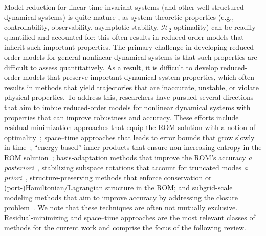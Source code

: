 \documentclass[3p,computermodern,10pt]{elsarticle}
\begin{document}
Model reduction for linear-time-invariant systems (and other well structured
dynamical systems) is quite mature
\cite{wilcox_benner_rev,moore,roberts,GugercinIRKA}, as system-theoretic properties (e.g., controllability,
observability, asymptotic stability, $\mathcal H_2$-optimality) can be readily
quantified and accounted for; this often results in
reduced-order models that inherit such important properties.  The primary
challenge in
developing reduced-order models for general nonlinear dynamical systems is
that such properties are difficult to assess quantitatively. As a result, it
is difficult to develop reduced-order models that preserve important
dynamical-system properties, which often results in methods that yield
trajectories that are
inaccurate, unstable, or violate physical properties.  To address this, researchers have pursued several directions that
aim to imbue reduced-order models for nonlinear
dynamical systems with properties that can improve robustness and accuracy.
These
efforts include residual-minimization approaches that equip the ROM solution with a notion of optimality~\cite{carlberg_lspg,carlberg_gnat,legresley_1,legresley_2,legresley_3,bui_resmin_steady,bui_unsteady,rovas_thesis,carlberg_thesis,bui_thesis,l1};
space--time approaches that leads to error bounds that grow slowly in time~\cite{choi_stlspg,constantine_strom,URBAN2012203,Yano2014ASC,benner_st};
``energy-based'' inner
products that ensure non-increasing entropy in the ROM
solution~\cite{rowley_pod_energyproj,Kalashnikova_sand2014,chan2019entropy};
basis-adaptation methods that improve the ROM's accuracy \textit{a
posteriori}~\cite{carlberg_hadaptation,adeim_peherstorfer,etter2019online}, stabilizing subspace rotations that account for truncated modes \textit{a priori}~\cite{basis_rotation}, structure-preserving
methods that enforce conservation \cite{carlberg_conservative_rom} or
(port-)Hamiltonian/Lagrangian structure
\cite{LALL2003304,carlberg2012spd,structurePreserveBeattie,chaturantabut2016structure,farhat2014dimensional} in the ROM; and subgrid-scale
modeling methods that aim to improve accuracy by addressing the closure
problem~\cite{san_iliescu_geostrophic,iliescu_pod_eddyviscosity,iliescu_vms_pod_ns,Bergmann_pod_vms,iliescu_ciazzo_residual_rom,Wang_ROM_thesis,wentland_apg,Wang:269133,San2018}.
We note that these techniques are often not mutually exclusive.
Residual-minimizing and space--time approaches are the most relevant classes of
methods for the current work and comprise the focus of the following review.
\end{document}
